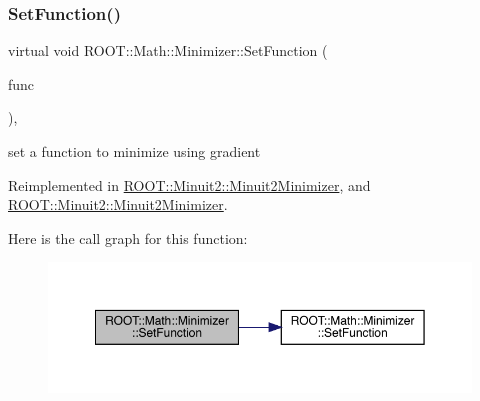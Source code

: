 \subsubsection{\texorpdfstring{SetFunction()}{SetFunction()}\hspace{0.1cm}{\footnotesize\ttfamily [4/4]}}
{\footnotesize\ttfamily virtual void R\+O\+O\+T\+::\+Math\+::\+Minimizer\+::\+Set\+Function (\begin{DoxyParamCaption}\item[{const \mbox{\hyperlink{namespaceROOT_1_1Math_a014e019aaf9304a00e9231bd9ed232fb}{R\+O\+O\+T\+::\+Math\+::\+I\+Multi\+Grad\+Function}} \&}]{func }\end{DoxyParamCaption})\hspace{0.3cm}{\ttfamily [inline]}, {\ttfamily [virtual]}}



set a function to minimize using gradient 



Reimplemented in \mbox{\hyperlink{classROOT_1_1Minuit2_1_1Minuit2Minimizer_aeb98c40cf3486fe8fb9bec4da0f7942e}{R\+O\+O\+T\+::\+Minuit2\+::\+Minuit2\+Minimizer}}, and \mbox{\hyperlink{classROOT_1_1Minuit2_1_1Minuit2Minimizer_aeb98c40cf3486fe8fb9bec4da0f7942e}{R\+O\+O\+T\+::\+Minuit2\+::\+Minuit2\+Minimizer}}.

Here is the call graph for this function\+:
\nopagebreak
\begin{figure}[H]
\begin{center}
\leavevmode
\includegraphics[width=350pt]{dc/dc4/classROOT_1_1Math_1_1Minimizer_a1d9ff15aa732e518a60a05dcbd82c34a_cgraph}
\end{center}
\end{figure}
\mbox{\label{classROOT_1_1Math_1_1Minimizer_a4303530cbb62ceb7cf9c9ebcbde530c2}} 

